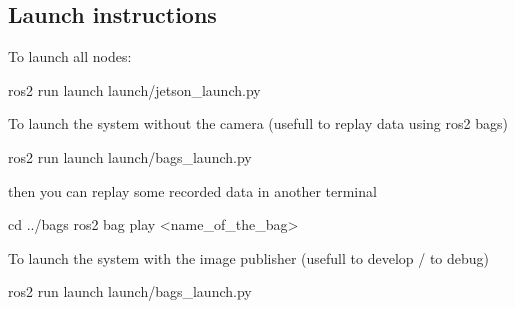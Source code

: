 \subsection*{Launch instructions}


\begin{DoxyEnumerate}
\item To launch all nodes\+: 
\begin{DoxyCode}
ros2 run launch launch/jetson\_launch.py
\end{DoxyCode}

\item To launch the system without the camera (usefull to replay data using ros2 bags) 
\begin{DoxyCode}
ros2 run launch launch/bags\_launch.py
\end{DoxyCode}
 then you can replay some recorded data in another terminal 
\begin{DoxyCode}
cd ../bags
ros2 bag play <name\_of\_the\_bag>
\end{DoxyCode}

\item To launch the system with the image publisher (usefull to develop / to debug) 
\begin{DoxyCode}
ros2 run launch launch/bags\_launch.py
\end{DoxyCode}
 
\end{DoxyEnumerate}